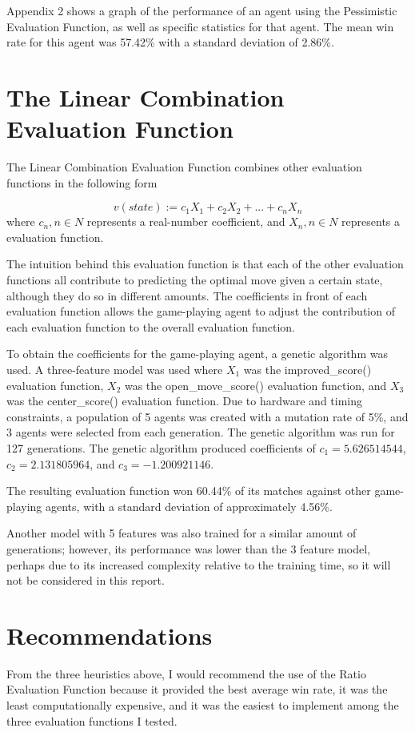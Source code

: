 \documentclass[12pt]{article}
\begin{document}
Appendix 2 shows a graph of the performance of an agent using the Pessimistic 
Evaluation Function, as well as specific statistics for that agent. The mean win 
rate for this agent was 57.42\% with a standard deviation of 2.86\%.

\section{The Linear Combination Evaluation Function}
The Linear Combination Evaluation Function combines other evaluation functions 
in the following form

\begin{equation*}
v(state):=c_1 X_1 + c_2 X_2 + ... + c_n X_n
\end{equation*}
where $c_n, n \in N$ represents a real-number coefficient, and $X_n, n\in N$ 
represents a evaluation function.

The intuition behind this evaluation function is that each of the other 
evaluation functions all contribute to predicting the optimal move given a 
certain state, although they do so in different amounts. The coefficients in 
front of each evaluation function allows the game-playing agent to adjust the 
contribution of each evaluation function to the overall evaluation function.

To obtain the coefficients for the game-playing agent, a genetic algorithm was 
used. A three-feature model was used where $X_1$ was the improved\_score() 
evaluation function, $X_2$ was the open\_move\_score() evaluation function, and 
$X_3$ was the center\_score() evaluation function. Due to hardware and timing 
constraints, a population of 5 agents was created with a mutation rate of 5\%, 
and 3 agents were selected from each generation. The genetic algorithm was run 
for 127 generations. The genetic algorithm produced coefficients of $c_1 = 
5.626514544$, $c_2 = 2.131805964$, and $c_3 = -1.200921146$.

The resulting evaluation function won 60.44\% of its matches against other 
game-playing agents, with a standard deviation of approximately 4.56\%. 

Another model with 5 features was also trained for a similar amount of 
generations; however, its performance was lower than the 3 feature model, 
perhaps due to its increased complexity relative to the training time, so it 
will not be considered in this report.

\section{Recommendations}
From the three heuristics above, I would recommend the use of the Ratio 
Evaluation Function because it provided the best average win rate, it was the 
least computationally expensive, and it was the easiest to implement among the 
three evaluation functions I tested.
\end{document}
